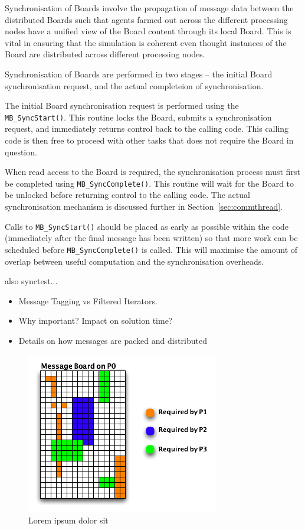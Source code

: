 Synchronisation of Boards involve the propagation of message data between the distributed Boards such that agents farmed out across the different processing nodes have a unified view of the Board content through its local Board. This is vital in ensuring that the simulation is coherent even thought instances of the Board are distributed across different processing nodes.

Synchronisation of Boards are performed in two stages -- the initial Board synchronisation request, and the actual completeion of synchronisation.

The initial Board synchronisation request is performed using the \texttt{MB\_SyncStart()}. This routine locks the Board, submits a synchronisation request, and immediately returns control back to the calling code. This calling code is then free to proceed with other tasks that does not require the Board in question. 

When read access to the Board is required, the synchronisation process must first be completed using \texttt{MB\_SyncComplete()}. This routine will wait for the Board to be unlocked before returning control to the calling code. The actual synchronisation mechanism is discussed further in Section~\ref{sec:commthread}.

Calls to \texttt{MB\_SyncStart()} should be placed as early as possible within the code (immediately after the final message has been written) so that more work can be scheduled before \texttt{MB\_SyncComplete()} is called. This will maximise the amount of overlap between useful computation and the synchronisation overheads.

also synctest...

\begin{itemize}
\item Message Tagging vs Filtered Iterators.
\item Why important? Impact on solution time?
\item Details on how messages are packed and distributed
\end{itemize} 

\begin{figure}[h]
 \centering
  \includegraphics[scale=0.70]{taggedboard.png}
 \caption{Lorem ipsum dolor sit}
 \label{fig:taggedboard}
\end{figure}


